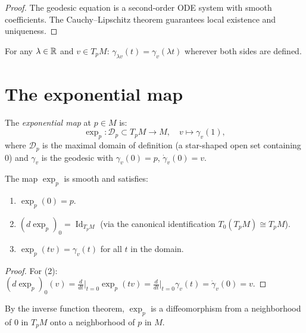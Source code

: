 \begin{proof}
The geodesic equation is a second-order ODE system with smooth coefficients.
The Cauchy--Lipschitz theorem guarantees local existence and uniqueness.
\end{proof}

\begin{proposition}[Homogeneity]
For any $\lambda \in \mathbb{R}$ and $v \in T_pM$:
$\gamma_{\lambda v}(t) = \gamma_v(\lambda t)$
wherever both sides are defined.
\end{proposition}

\section{The exponential map}

\begin{definition}
The \emph{exponential map} at $p \in M$ is:
\[
    \exp_p : \mathcal{D}_p \subset T_pM \to M, \quad v \mapsto \gamma_v(1),
\]
where $\mathcal{D}_p$ is the maximal domain of definition (a star-shaped open set
containing $0$) and $\gamma_v$ is the geodesic with $\gamma_v(0) = p$,
$\dot\gamma_v(0) = v$.
\end{definition}

\begin{proposition}
The map $\exp_p$ is smooth and satisfies:
\begin{enumerate}
    \item $\exp_p(0) = p$.
    \item $(d\exp_p)_0 = \operatorname{Id}_{T_pM}$ (via the canonical identification
          $T_0(T_pM) \cong T_pM$).
    \item $\exp_p(tv) = \gamma_v(t)$ for all $t$ in the domain.
\end{enumerate}
\end{proposition}

\begin{proof}
For (2): $(d\exp_p)_0(v) = \frac{d}{dt}\Big|_{t=0} \exp_p(tv)
= \frac{d}{dt}\Big|_{t=0} \gamma_v(t) = \dot\gamma_v(0) = v$.
\end{proof}

\begin{corollary}
By the inverse function theorem, $\exp_p$ is a diffeomorphism from a neighborhood
of $0$ in $T_pM$ onto a neighborhood of $p$ in $M$.
\end{corollary}

